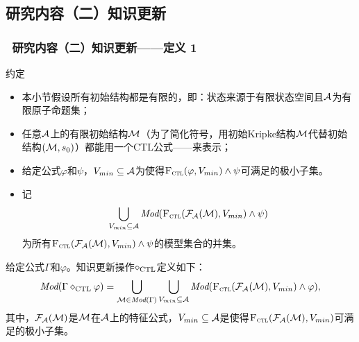 \documentclass[aspectratio=1610, 9pt, CJK]{beamer}
\begin{document}
\subsection{研究内容（二）知识更新}
\begin{frame}
	\frametitle{~研究内容（二）知识更新——{\footnotesize 定义 1}}
	{\footnotesize
		\begin{block}{约定}
			\begin{itemize}
				\item 本小节假设所有初始结构都是有限的，即：状态来源于有限状态空间且${\cal A}$为有限原子命题集；
				\item 任意${\cal A}$上的有限初始结构${\cal M}$（为了简化符号，用初始Kripke结构${\cal M}$代替初始结构$({\cal M},s_0)$）都能用一个CTL公式——来表示；
				\item 给定公式$\varphi$和$\psi$，$V_{min}\subseteq {\cal A}$为使得${\textsc{F}_{\textsc{ctl}}}(\varphi, V_{min}) \wedge \psi$可满足的极小子集。
				\item 记
				$$\bigcup_{V_{min}\subseteq {\cal A}} \textit{Mod}({\textsc{F}_{\textsc{ctl}}}({\cal F}_{{\cal A}}({\cal M}), V_{min}) \wedge \psi)$$  
				为所有${\textsc{F}_{\textsc{ctl}}}({\cal F}_{{\cal A}}({\cal M}), V_{min}) \wedge \psi$的模型集合的并集。
			\end{itemize}
		\end{block}
		
		\begin{definition}\label{def:KU}
			给定公式$\Gamma$和$\varphi$。知识更新操作$\diamond_{\textrm{CTL}}$定义如下：
			\[
			\textit{Mod}(\Gamma \diamond_{\textrm{CTL}} \varphi) = \bigcup_{{\cal M} \in \textit{Mod}(\Gamma)} \bigcup_{V_{min}\subseteq {\cal A}} \textit{Mod}({\textsc{F}_{\textsc{ctl}}}({\cal F}_{{\cal A}}({\cal M}), V_{min}) \wedge \varphi),
			\]
			其中，${\cal F}_{{\cal A}}({\cal M})$是${\cal M}$在${\cal A}$上的特征公式，$V_{min} \subseteq {\cal A}$是使得${\textsc{F}_{\textsc{ctl}}}({\cal F}_{{\cal A}}({\cal M}), V_{min})$可满足的极小子集。
		\end{definition}
	}
\end{frame}
\end{document}
